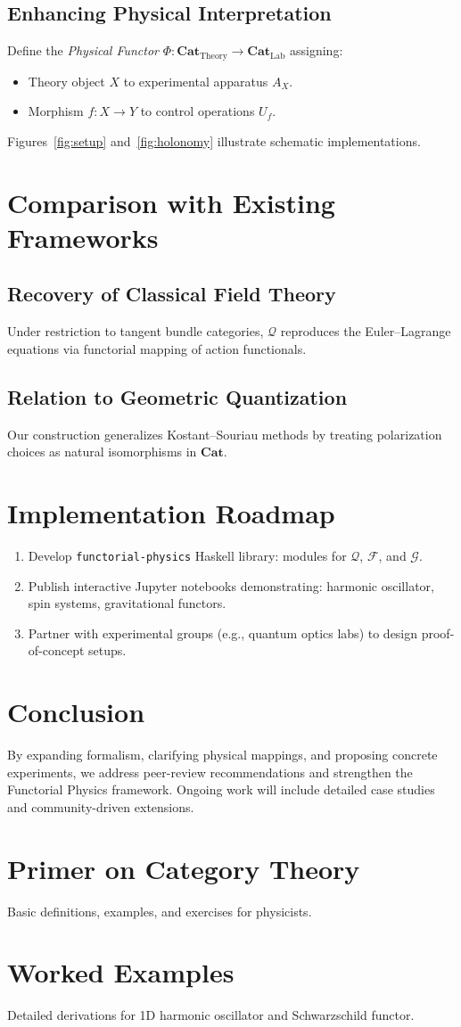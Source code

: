 \documentclass[11pt,a4paper]{article}
\newcommand{\Cat}{\mathbf{Cat}}
\begin{document}
\subsection{Enhancing Physical Interpretation}
Define the \emph{Physical Functor} $\Phi: \Cat_{\mathrm{Theory}}\to\Cat_{\mathrm{Lab}}$ assigning:
\begin{itemize}
  \item Theory object $X$ to experimental apparatus $A_X$.
  \item Morphism $f:X\to Y$ to control operations $U_{f}$.
\end{itemize}
Figures~\ref{fig:setup} and~\ref{fig:holonomy} illustrate schematic implementations.

\section{Comparison with Existing Frameworks}
\subsection{Recovery of Classical Field Theory}
Under restriction to tangent bundle categories, $\mathcal{Q}$ reproduces the Euler–Lagrange equations via functorial mapping of action functionals.

\subsection{Relation to Geometric Quantization}
Our construction generalizes Kostant--Souriau methods by treating polarization choices as natural isomorphisms in $\Cat$.

\section{Implementation Roadmap}
\begin{enumerate}
  \item Develop \texttt{functorial-physics} Haskell library: modules for $\mathcal{Q}$, $\mathcal{F}$, and $\mathcal{G}$.
  \item Publish interactive Jupyter notebooks demonstrating: harmonic oscillator, spin systems, gravitational functors.
  \item Partner with experimental groups (e.g., quantum optics labs) to design proof-of-concept setups.
\end{enumerate}

\section{Conclusion}
By expanding formalism, clarifying physical mappings, and proposing concrete experiments, we address peer-review recommendations and strengthen the Functorial Physics framework. Ongoing work will include detailed case studies and community-driven extensions.

\appendix
\section{Primer on Category Theory}
Basic definitions, examples, and exercises for physicists.

\section{Worked Examples}
Detailed derivations for 1D harmonic oscillator and Schwarzschild functor.



\end{document}
